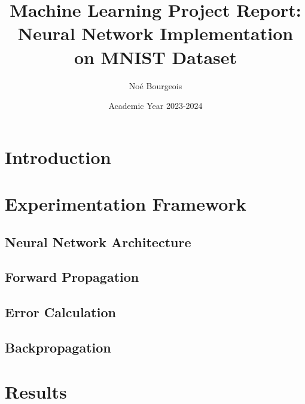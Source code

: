 \documentclass{article}
\title{Machine Learning Project Report: Neural Network Implementation on MNIST Dataset}
\author{Noé Bourgeois}
\date{Academic Year 2023-2024}
\begin{document}
\maketitle

\begin{abstract}
\end{abstract}

\section{Introduction}

\section{Experimentation Framework}

\subsection{Neural Network Architecture}

\subsection{Forward Propagation}

\subsection{Error Calculation}

\subsection{Backpropagation}


\section{Results}
\end{document}
